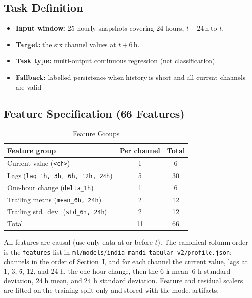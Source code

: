 \documentclass[journal,a4paper]{IEEEtran}
\begin{document}
\subsection{Task Definition}

\begin{itemize}
  \item \textbf{Input window:} 25 hourly snapshots covering 24 hours, $t-24\,\text{h}$ to $t$.
  \item \textbf{Target:} the six channel values at $t+6\,\text{h}$.
  \item \textbf{Task type:} multi-output continuous regression (not classification).
  \item \textbf{Fallback:} labelled persistence when history is short and all current channels are valid.
\end{itemize}

\subsection{Feature Specification (66 Features)}

\begin{table}[!htbp]
\caption{Feature Groups}
\label{tab:features}
\centering
\footnotesize
\begin{tabular}{@{}lcc@{}}
\toprule
Feature group & Per channel & Total \\
\midrule
Current value (\texttt{<ch>}) & 1 & 6 \\
Lags (\texttt{lag\_1h, 3h, 6h, 12h, 24h}) & 5 & 30 \\
One-hour change (\texttt{delta\_1h}) & 1 & 6 \\
Trailing means (\texttt{mean\_6h, 24h}) & 2 & 12 \\
Trailing std.\ dev.\ (\texttt{std\_6h, 24h}) & 2 & 12 \\
\midrule
Total & 11 & 66 \\
\bottomrule
\end{tabular}
\end{table}

All features are causal (use only data at or before $t$). The canonical column order is the \texttt{features} list in \nolinkurl{ml/models/india_mandi_tabular_v2/profile.json}: channels in the order of Section~I, and for each channel the current value, lags at 1, 3, 6, 12, and 24 h, the one-hour change, then the 6 h mean, 6 h standard deviation, 24 h mean, and 24 h standard deviation. Feature and residual scalers are fitted on the training split only and stored with the model artifacts.
\end{document}
